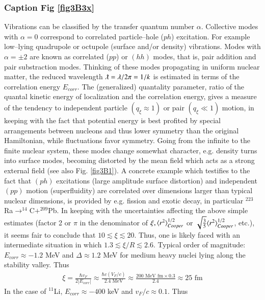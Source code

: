 \begin{subappendices}
         \subsubsection{Caption Fig \ref{fig3B3x}}
         Vibrations can be classified by the transfer quantum number $\alpha$. Collective modes with $\alpha=0$ correspond to correlated particle--hole ($ph$) excitation. For example low--lying quadrupole or octupole (surface and/or density) vibrations. Modes with $\alpha=\pm2$ are known as correlated ($pp$) or $(hh)$ modes, that is, pair addition and pair substraction modes.
         Thinking of these modes propagating in uniform nuclear matter, the reduced wavelength $\lambdabar=\lambda/2\pi=1/k$ is estimated in terms of the correlation energy $E_{corr}$. The (generalized) quantality parameter, ratio of the quantal kinetic energy of localization and the correlation energy,  gives a measure of the tendency to independent particle $(q_\xi\approx1)$ or pair $(q_\xi\ll1)$ motion, in keeping with the fact that potential energy is best profited by special arrangements between nucleons and thus lower symmetry than the original Hamiltonian, while fluctuations favor symmetry. Going from the infinite to the finite nuclear system, these modes change somewhat character, e.g. density turns into surface modes, becoming distorted by the mean field which acts as a strong external field (see also Fig. \ref{fig3B1}). A concrete example which testifies to the fact that $(ph)$ excitations (large amplitude surface distortion) and independent $(pp)$ motion (superfluidity) are correlated over dimensions larger than typical nuclear dimensions, is provided by e.g. fission and exotic decay, in particular $^{223}$Ra$\rightarrow^{14}$C$+^{209}$Pb. In keeping with the uncertainties affecting the above simple estimates (factor 2 or $\pi$ in the denominator of $\xi,\langle {r^2} \rangle^{1/2}_{Cooper}$ or $\sqrt{\frac{3}{5}}\langle {r^2} \rangle^{1/2}_{Cooper}$, etc.), it seems fair to conclude that $10\lesssim\xi\lesssim20$. Thus, one is likely faced with an intermediate situation in which $1.3\lesssim\xi/R\lesssim2.6.$
         \newpage
 Typical order of magnitude: $E_{corr}\approx -1.2 $ MeV and $\Delta\approx 1.2$ MeV for medium heavy nuclei lying along the stability valley. Thus
 \begin{align}
 \xi=\frac{\hbar v_F}{2|E_{corr}|}\approx\frac{\hbar c(V_F/c)}{2.4\text{ MeV}}\approx\frac{200\text{ MeV fm}\times 0.3}{2.4}\approx 25\text{ fm}
 \end{align} 
 In the case of $^{11}$Li, $E_{corr}\approx-400$ keV and $v_F/c\approx 0.1$. Thus

\end{subappendices}
